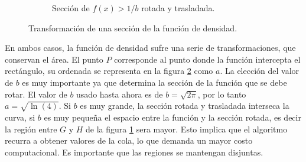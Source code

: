 \begin{figure}[ht!]
\begin{subfigure}{0.45\textwidth}
        \caption{Sección de $f(x) > 1/b$ rotada y trasladada.}
        \label{fig:f-rotada-b}
    \end{subfigure}
    \caption{Transformación de una sección de la función de densidad.}
    \label{fig:f-rotada}
\end{figure}
En ambos casos, la función de densidad sufre una serie de transformaciones, que conservan el área. El punto $P$ corresponde al punto donde la función
intercepta el rectángulo, su ordenada se  representa en la figura \ref{fig:f-rotada} como $a$.
\clearpage
La elección del valor de $b$ es muy importante
ya que determina la sección de la función que se debe rotar.
El valor de $b$ usado hasta ahora es de $b=\sqrt{2\pi}$, por lo tanto $a = \sqrt{\ln(4)}$.
Si $b$ es muy grande, la sección rotada y trasladada interseca la curva, si $b$ es muy pequeña el espacio entre la función y la sección
rotada, es decir la región entre $G$ y $H$ de la figura \ref{fig:f-rotada-b} sera mayor. Esto implica que el algoritmo recurra a obtener valores de la cola, lo que demanda un mayor costo computacional.
Es importante que las regiones se mantengan disjuntas.
% 
